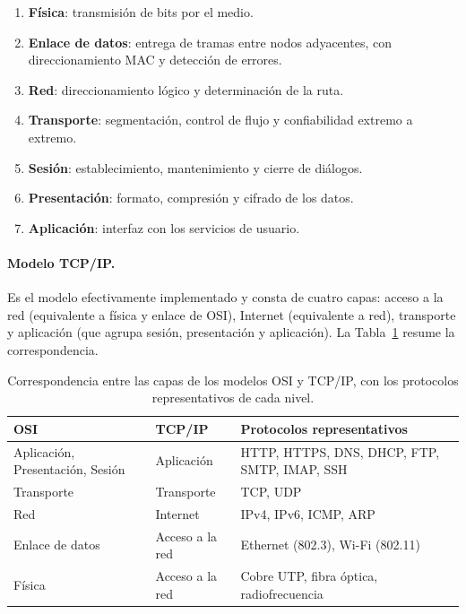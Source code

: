 \documentclass[11pt,a4paper]{article}
\begin{document}
\begin{enumerate}[leftmargin=*]
  \item \textbf{Física}: transmisión de bits por el medio.
  \item \textbf{Enlace de datos}: entrega de tramas entre nodos adyacentes,
        con direccionamiento MAC y detección de errores.
  \item \textbf{Red}: direccionamiento lógico y determinación de la ruta.
  \item \textbf{Transporte}: segmentación, control de flujo y confiabilidad
        extremo a extremo.
  \item \textbf{Sesión}: establecimiento, mantenimiento y cierre de diálogos.
  \item \textbf{Presentación}: formato, compresión y cifrado de los datos.
  \item \textbf{Aplicación}: interfaz con los servicios de usuario.
\end{enumerate}

\paragraph{Modelo TCP/IP.} Es el modelo efectivamente implementado y consta de
cuatro capas: acceso a la red (equivalente a física y enlace de OSI),
Internet (equivalente a red), transporte y aplicación (que agrupa sesión,
presentación y aplicación). La Tabla~\ref{tab:osi-tcpip} resume la
correspondencia.

\begin{table}[htbp]
  \centering
  \small
  \begin{tabular}{@{}p{3.1cm}p{2.6cm}p{6.4cm}@{}}
    \toprule
    \textbf{OSI} & \textbf{TCP/IP} & \textbf{Protocolos representativos} \\ \midrule
    Aplicación, Presentación, Sesión & Aplicación & HTTP, HTTPS, DNS, DHCP, FTP, SMTP, IMAP, SSH \\
    Transporte & Transporte & TCP, UDP \\
    Red & Internet & IPv4, IPv6, ICMP, ARP \\
    Enlace de datos & Acceso a la red & Ethernet (802.3), Wi-Fi (802.11) \\
    Física & Acceso a la red & Cobre UTP, fibra óptica, radiofrecuencia \\ \bottomrule
  \end{tabular}
  \caption{Correspondencia entre las capas de los modelos OSI y TCP/IP, con los
  protocolos representativos de cada nivel.}
  \label{tab:osi-tcpip}
\end{table}
\end{document}
